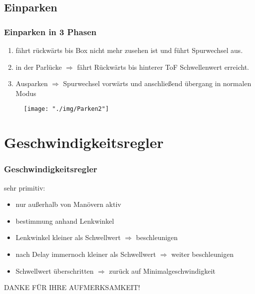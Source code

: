 \documentclass{beamer}
\begin{document}
	\subsection{Einparken}
	
	\begin{frame}
		\frametitle{Einparken in 3 Phasen}
		
		\begin{enumerate}
			\item fährt rückwärts bis Box nicht mehr zusehen ist und führt Spurwechsel aus.
			\item in der Parlücke $\Rightarrow$ fährt Rückwärts bis hinterer ToF Schwellenwert erreicht.
			\item Ausparken $\Rightarrow$ Spurwechsel vorwärts und anschließend übergang in normalen Modus
		\end{enumerate}
		
		\begin{center}
			\begin{figure}[h]
				\texttt{[image: "./img/Parken2"]}
				\label{fig:Parken2}
			\end{figure}
		\end{center}
		
	\end{frame}
	
	\section{Geschwindigkeitsregler}
	 
	\begin{frame}
	\frametitle{Geschwindigkeitsregler}
	sehr primitiv:
		\begin{itemize}
			\item nur außerhalb von Manövern aktiv
			\item bestimmung anhand Lenkwinkel
			\item Lenkwinkel kleiner als Schwellwert $\Rightarrow$ beschleunigen
			\item nach Delay immernoch kleiner als Schwellwert $\Rightarrow$ weiter beschleunigen
			\item Schwellwert überschritten $\Rightarrow$ zurück auf Minimalgeschwindigkeit
		\end{itemize}
	\end{frame}
	
	\begin{frame}
		\center
		DANKE FÜR IHRE AUFMERKSAMKEIT!
	\end{frame}
\end{document}
